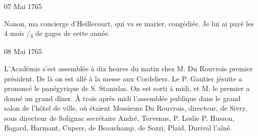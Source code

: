                      \begin{diary}{07 Mai 1765}{}
                        
                        
                           Nanon, ma concierge d'Heillecourt, qui
                           va se marier, congédiée. Je lui ai payé
                           les 4 mois /\textsubscript{4} de gages de
                           cette année. \bigskip
        
        
                     \end{diary}
                     \begin{diary}{08 Mai 1765}{}
                        
                        
                           L'Académie s'est assemblée à dix
                           heures du
                           matin chez
                           M. Du Rouvrois
                           premier président. De là
                           on est allé à la messe aux Cordeliers. Le P.
                              Gautier
                           jésuite a prononcé le panégyrique de
                           S. Stanislas. On est sorti à midi, et M.
                              le premier a donné un grand dîner. À
                           trois après midi l'assemblée publique dans
                           le grand salon de l'hôtel de
                              ville, où étaient
                           Messieurs
                           Du Rouvrois, directeur, de Sivry, sous directeur
                           de Solignac
                           secrétaire
                           André, Tervenus, P. Leslie
                           P. Husson, Bagard, Harmant, Cupers,
                           de Beauchamp, de Sozzi, Plaid,
                           Durival l'aîné. \bigskip
        
        
                        

\end{diary}
